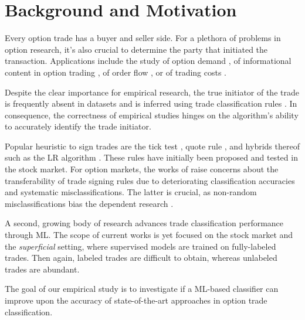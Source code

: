 

\section{Background and Motivation}

Every option trade has a buyer and seller side. For a plethora of problems in option research, it’s also crucial to determine the party that initiated the transaction. Applications include the study of option demand \autocite[][]{garleanuDemandBasedOptionPricing2009}, of informational content in option trading \autocites[][]{huDoesOptionTrading2014}[][]{panInformationOptionVolume2006}[][]{caoInformationalContentOption2005}, of order flow \autocite[][]{muravyevOrderFlowExpected2016}, or of trading costs \autocite[][]{muravyevOptionsTradingCosts2020}. 

Despite the clear importance for empirical research, the true initiator of the trade is frequently absent in datasets and is inferred using trade classification rules \autocite[][]{easleyOptionVolumeStock1998}. In consequence, the correctness of empirical studies hinges on the algorithm's ability to accurately identify the trade initiator.

Popular heuristic to sign trades are the tick test \autocite[][]{hasbrouckTradesQuotesInventories1988}, quote rule \autocite[][]{harrisDayEndTransactionPrice1989}, and hybrids thereof such as the \gls{LR} algorithm \autocite[][]{leeInferringTradeDirection1991}. These rules have initially been proposed and tested in the stock market. For option markets, the works of \textcites[][]{savickasInferringDirectionOption2003}[][]{grauerOptionTradeClassification2022} raise concerns about the transferability of trade signing rules due to deteriorating classification accuracies and systematic misclassifications. The latter is crucial, as non-random misclassifications bias the dependent research \autocites[][]{odders-whiteOccurrenceConsequencesInaccurate2000}[][]{theissenTestAccuracyLee2001}.

A second, growing body of research \autocites{blazejewskiLocalNonParametricModel2005}{rosenthalModelingTradeDirection2012}{ronenMachineLearningTrade2022} advances trade classification performance through \gls{ML}. The scope of current works is yet focused on the stock market and the \textit{superficial} setting, where supervised models are trained on fully-labeled trades. Then again, labeled trades are difficult to obtain, whereas unlabeled trades are abundant.

The goal of our empirical study is to investigate if a \gls{ML}-based classifier can improve upon the accuracy of state-of-the-art approaches in option trade classification.

